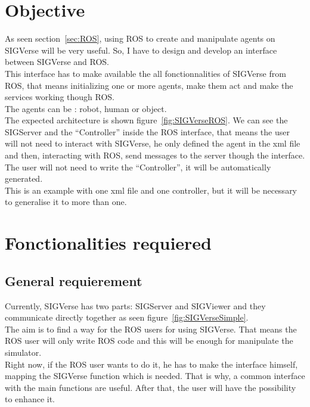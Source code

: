 \section{Objective}
As seen section~\ref{sec:ROS}, using ROS to create and manipulate agents on SIGVerse will be very useful. So, I have to design and develop an interface between SIGVerse and ROS.\\
This interface has to make available the all fonctionnalities of SIGVerse from ROS, that means initializing one or more agents, make them act and make the services working though ROS.\\
The agents can be : robot, human or object.\\
The expected architecture is shown figure~\ref{fig:SIGVerseROS}. We can see the SIGServer and the ``Controller'' inside the ROS interface, that means the user will not need to interact with SIGVerse, he only defined the agent in the xml file and then, interacting with ROS, send messages to the server though the interface. The user will not need to write the ``Controller'', it will be automatically generated.\\
This is an example with one xml file and one controller, but it will be necessary to generalise it to more than one.

\noindent\begin{minipage}{\linewidth}%
\label{fig:SIGVerseROS}%
\end{minipage}

\section{Fonctionalities requiered}
\subsection{General requierement} %
Currently, SIGVerse has two parts: SIGServer and SIGViewer and they communicate directly together as seen figure~\ref{fig:SIGVerseSimple}.\\
The aim is to find a way for the ROS users for using SIGVerse. That means the ROS user will only write ROS code and this will be enough for manipulate the simulator.\\
Right now, if the ROS user wants to do it, he has to make the interface himself, mapping the SIGVerse function which is needed. That is why, a common interface with the main functions are useful. After that, the user will have the possibility to enhance it.\\

